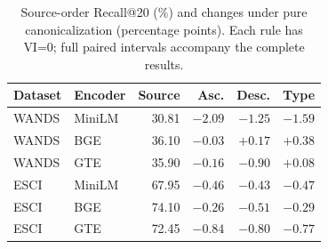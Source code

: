 \begin{table}[!t]
\centering
\caption{Source-order Recall@20 (\%) and changes under pure canonicalization (percentage points). Each rule has VI=0; full paired intervals accompany the complete results.}
\label{tab:canonical_top20}
\small
\setlength{\tabcolsep}{3pt}
\begin{tabular}{llrrrr}
\toprule
Dataset & Encoder & Source & Asc. & Desc. & Type \\
\midrule
WANDS & MiniLM & 30.81 & $-2.09$ & $-1.25$ & $-1.59$ \\
WANDS & BGE & 36.10 & $-0.03$ & $+0.17$ & $+0.38$ \\
WANDS & GTE & 35.90 & $-0.16$ & $-0.90$ & $+0.08$ \\
\midrule
ESCI & MiniLM & 67.95 & $-0.46$ & $-0.43$ & $-0.47$ \\
ESCI & BGE & 74.10 & $-0.26$ & $-0.51$ & $-0.29$ \\
ESCI & GTE & 72.45 & $-0.84$ & $-0.80$ & $-0.77$ \\
\bottomrule
\end{tabular}
\end{table}
